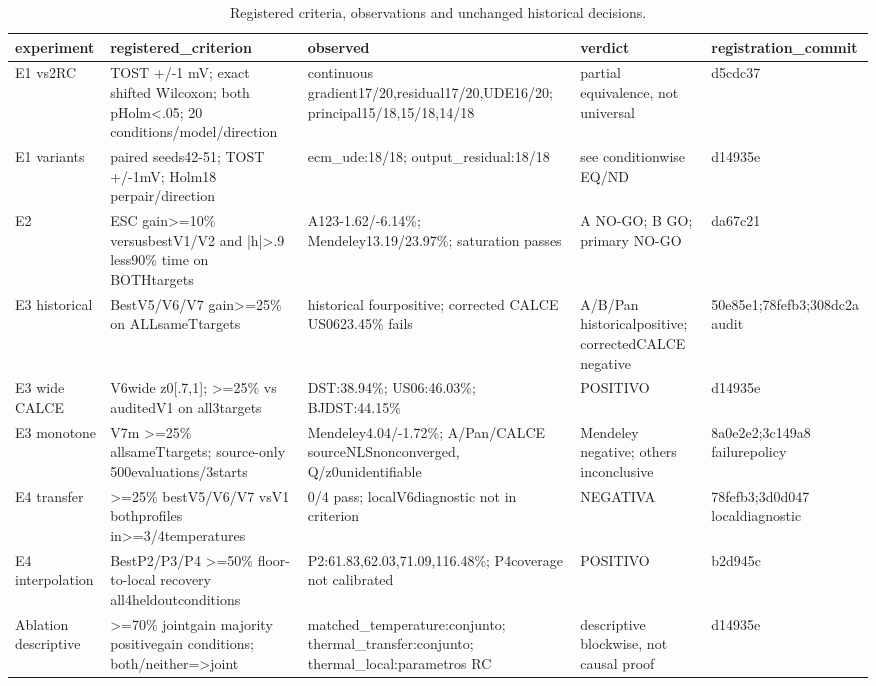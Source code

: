 \begin{table}[!t]
\centering
\footnotesize
\caption{Registered criteria, observations and unchanged historical decisions.}
\label{tab:reviewer-criteria}
\setlength{\tabcolsep}{3pt}
\begin{tabular}{p{} p{} p{} p{} p{}}
\toprule
experiment & registered\_criterion & observed & verdict & registration\_commit \\
\midrule
E1 vs2RC & TOST +/-1 mV; exact shifted Wilcoxon; both pHolm<.05; 20 conditions/model/direction & continuous gradient17/20,residual17/20,UDE16/20; principal15/18,15/18,14/18 & partial equivalence, not universal & d5cdc37 \\
E1 variants & paired seeds42-51; TOST +/-1mV; Holm18 perpair/direction & ecm\_ude:18/18; output\_residual:18/18 & see conditionwise EQ/ND & d14935e \\
E2 & ESC gain>=10\% versusbestV1/V2 and |h|>.9 less90\% time on BOTHtargets & A123-1.62/-6.14\%; Mendeley13.19/23.97\%; saturation passes & A NO-GO; B GO; primary NO-GO & da67c21 \\
E3 historical & BestV5/V6/V7 gain>=25\% on ALLsameTtargets & historical fourpositive; corrected CALCE US0623.45\% fails & A/B/Pan historicalpositive; correctedCALCE negative & 50e85e1;78fefb3;308dc2a audit \\
E3 wide CALCE & V6wide z0[.7,1]; >=25\% vs auditedV1 on all3targets & DST:38.94\%; US06:46.03\%; BJDST:44.15\% & POSITIVO & d14935e \\
E3 monotone & V7m >=25\% allsameTtargets; source-only 500evaluations/3starts & Mendeley4.04/-1.72\%; A/Pan/CALCE sourceNLSnonconverged, Q/z0unidentifiable & Mendeley negative; others inconclusive & 8a0e2e2;3c149a8 failurepolicy \\
E4 transfer & >=25\% bestV5/V6/V7 vsV1 bothprofiles in>=3/4temperatures & 0/4 pass; localV6diagnostic not in criterion & NEGATIVA & 78fefb3;3d0d047 localdiagnostic \\
E4 interpolation & BestP2/P3/P4 >=50\% floor-to-local recovery all4heldoutconditions & P2:61.83,62.03,71.09,116.48\%; P4coverage not calibrated & POSITIVO & b2d945c \\
Ablation descriptive & >=70\% jointgain majority positivegain conditions; both/neither=>joint & matched\_temperature:conjunto; thermal\_transfer:conjunto; thermal\_local:parametros RC & descriptive blockwise, not causal proof & d14935e \\
\bottomrule
\end{tabular}
\end{table}
